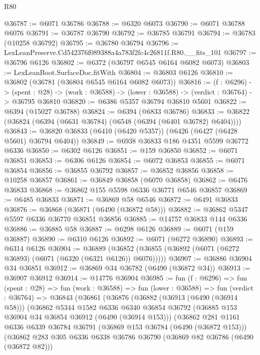\begin{lexlean}{R80}
\begin{coremodule}
@36787 := @6071 @36786
@36788 := @6320 @6073
@36790 := @6071 @36788 @6076
@36791 := @36787 @36790
@36792 := @36785 @36791
@36794 := @36783 (@10258 @36792)
@36795 := @36780 @36794
@36796 := LexLeanPreserve.Cd542376f089388a4a783f2fc4c26811f.R80.__fits_101
@36797 := @36796 @6126
@36802 := @6372 (@36797 @6545 @6164 @6082 @6073)
@36803 := LexLeanBoot.SurfaceDoc.fitWith
@36804 := @36803 @6126
@36810 := @36802 (@36781 (@36804 @6545 @6164 @6082 @6073))
@36816 := (f : @6296) ->
  (spent : @28) -> (work : @36588) -> (lower : @36588) -> (verdict : @36764) -> @36795 @36810
@36820 := @6386 @5357 @36794 @36810 @5601
@36822 := @6394 (@15027 @36788)
@36824 := @6394 (@6833 @36786)
@36833 := @36822 (@36824 (@6394 (@6631 @36784) (@6548 (@6394 (@6401 @36782) @6404))))
@36843 := @36820 @36833 (@6410 (@6420 @5357)) (@6426 (@6427 (@6428 @5601) @36794 @6404))
@36849 := @6938 @36833 @186 @4351 @5599 @36772 @6336
@36850 := @6302 @6126
@36851 := @159 @36850
@36852 := @6071 @36851
@36853 := @6306 @6126
@36854 := @6072 @36853
@36855 := @6071 @36854
@36856 := @36855 @36792
@36857 := @36852 @36856
@36858 := @10258 @36857
@36861 := @36849 @36858 (@6070 @36858)
@36862 := @6476 @36833
@36868 := @36862 @155 @5598 @6336 @36771 @6546 @36857
@36869 := @6485 @36833
@36871 := @36869 @58 @6546
@36872 := @6491 @36833
@36876 := @36868 (@36871 (@6490 (@36872 @58)))
@36882 := @36862 @5347 @5597 @6336 @36770 @36851 @36856
@36885 := @14757 @36833 @144 @6336
@36886 := @36885 @58
@36887 := @6298 @6126
@36889 := @6071 (@159 @36887)
@36890 := @6310 @6126
@36892 := @6071 (@6272 @36890)
@36893 := @6314 @6126
@36904 := @36889
    (@36852 (@36855 (@36892 (@6071 (@6272 @36893) (@6071 (@6320 (@6321 @6126)) @6076)))))
@36907 := @36886 @36904 @34 @36851
@36912 := @36869 @34 @36782 (@6490 (@36872 @34))
@36913 := @36907 @36912
@36914 := @14776 @36904
@36985 := fun (f : @6296) =>
  fun (spent : @28) =>
  fun (work : @36588) =>
  fun (lower : @36588) =>
  fun (verdict : @36764) =>
  @36843
    (@36861
      (@36876
        (@36882
          (@36913 (@6490 (@36914 @58)))
          (@36862
            @5344
            @1582
            @6336
            @6340
            @36854
            @36792
            (@36885 @153 @36904 @34 @36854 @36912 (@6490 (@36914 @153)))
            (@36862
              @281
              @1161
              @6336
              @6339
              @36784
              @36791
              (@36869 @153 @36784 (@6490 (@36872 @153)))
              (@36862
                @283
                @305
                @6336
                @6338
                @36786
                @36790
                (@36869 @82 @36786 (@6490 (@36872 @82)))

\end{coremodule}
\end{lexlean}
